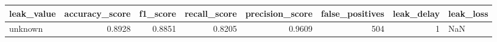 \begin{tabular}{lrrrrrrl}
\toprule
leak\_value & accuracy\_score & f1\_score & recall\_score & precision\_score & false\_positives & leak\_delay & leak\_loss \\
\midrule
unknown & 0.8928 & 0.8851 & 0.8205 & 0.9609 & 504 & 1 & NaN \\
\bottomrule
\end{tabular}
